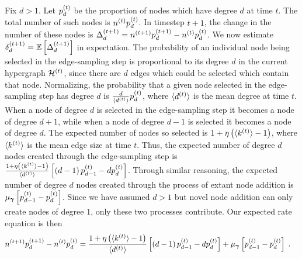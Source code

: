 Fix $d > 1$. 
Let $p^{(t)}_d$ be the proportion of nodes which have degree $d$ at time $t$. 
The total number of such nodes is $n^{(t)} p^{(t)}_d$. 
In timestep $t+1$, the change in the number of these nodes is $\Delta^{(t+1)}_d = n^{(t+1)} p^{(t+1)}_d - n^{(t)} p^{(t)}_d$. 
We now estimate $\delta^{(t+1)}_d = \mathbb{E}\left[\Delta^{(t+1)}_d\right]$ in expectation. 
The probability of an individual node being selected in the edge-sampling step is proportional to its degree $d$ in the current hypergraph $\mathcal{H}^{(t)}$, since there are $d$ edges which could be selected which contain that node. 
Normalizing, the probability that a given node selected in the edge-sampling step has degree $d$ is $\frac{d}{\langle d^{(t)} \rangle}p^{(t)}_d$, where $\langle d^{(t)} \rangle$ is the mean degree at time $t$. 
When a node of degree $d$ is selected in the edge-sampling step it becomes a node of degree $d+1$, while when a node of degree $d-1$ is selected it becomes a node of degree $d$. 
The expected number of nodes so selected is $1 + \eta\left(\langle k^{(t)} \rangle-1\right)$, where $\langle k^{(t)} \rangle$ is the mean edge size at time $t$. 
Thus, the expected number of degree $d$ nodes created through the edge-sampling step is $\frac{1 + \eta\left(\langle k^{(t)} \rangle-1\right)}{\langle d^{(t)} \rangle}\left[\left(d-1\right)p^{(t)}_{d-1} - dp^{(t)}_d\right]$. 
Through similar reasoning, the expected number of degree $d$ nodes created through the process of extant node addition is $\mu_{\boldsymbol{\gamma}}\left[p^{(t)}_{d-1} - p^{(t)}_d\right]$.
Since we have assumed $d > 1$ but novel node addition can only create nodes of degree $1$, only these two processes contribute. 
Our expected rate equation is then 
\begin{align}
    n^{(t+1)} p^{(t+1)}_d - n^{(t)} p^{(t)}_d &=  \frac{1 + \eta\left(\langle k^{(t)} \rangle-1\right)}{\langle d^{(t)} \rangle}\left[\left(d-1\right)p^{(t)}_{d-1} - dp^{(t)}_d\right]  + \mu_{\boldsymbol{\gamma}}\left[p^{(t)}_{d-1} - p^{(t)}_d\right]\;. \label{eq:rate-equation}
\end{align}

